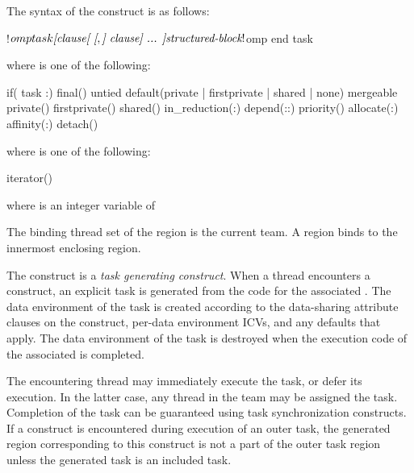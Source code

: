 \begin{fortranspecific}
The syntax of the  construct is as follows:

\begin{ompfPragma}
!$omp task \plc{[clause[ [},\plc{] clause] ... ]}
    \plc{structured-block}
!$omp end task
\end{ompfPragma}

where  is one of the following{}:

\begin{indentedcodelist}
if(\plc{[} task :\plc{] scalar-logical-expression})
final()
untied
default(private \textnormal{|} firstprivate \textnormal{|} shared \textnormal{|} none)
mergeable
private()
firstprivate()
shared()
in_reduction(:)
depend(\plc{[depend-modifier}:\plc{][dependence-type }:\plc{] locator-list})
priority()
allocate(\plc{[allocator }:\plc{] list})
affinity(\plc{[aff-modifier }:\plc{] locator-list})
detach()
\end{indentedcodelist}

where  is one of the following{}:
\begin{indentedcodelist}
iterator() 
\end{indentedcodelist}

where  is an integer variable of  

\end{fortranspecific}

\binding
The binding thread set of the  region is the current team. A  region binds to
the innermost enclosing  region.

\descr

The  construct is a \emph{task generating construct}. When a thread
encounters a  construct, an explicit task is generated from the code
for the associated . The data environment of the task is
created according to the data-sharing attribute clauses on the 
construct, per-data environment ICVs, and any defaults that apply. The data environment of the task is destroyed 
when the execution code of the associated  is completed.

The encountering thread may immediately execute the task, or defer its execution. In the
latter case, any thread in the team may be assigned the task. Completion of the task can
be guaranteed using task synchronization constructs.
If a  construct is encountered during execution of an outer
task, the generated  region corresponding to this construct is not a
part of the outer task region unless the generated task is
an included task.

